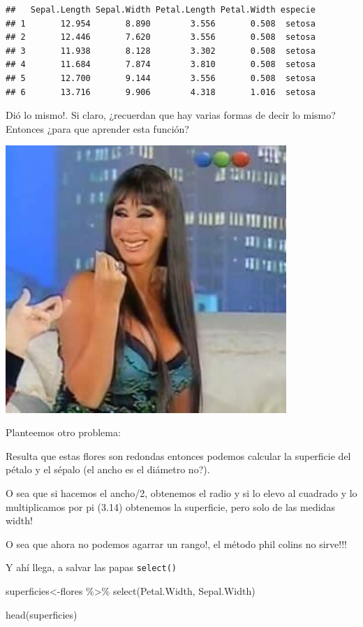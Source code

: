 \documentclass[
]{book}
\newenvironment{Shaded}{\begin{snugshade}}{\end{snugshade}}
\newcommand{\FunctionTok}[1]{\textcolor[rgb]{0.00,0.00,0.00}{#1}}
\newcommand{\NormalTok}[1]{#1}
\newcommand{\OtherTok}[1]{\textcolor[rgb]{0.56,0.35,0.01}{#1}}
\newcommand{\SpecialCharTok}[1]{\textcolor[rgb]{0.00,0.00,0.00}{#1}}
\begin{document}
\begin{verbatim}
##   Sepal.Length Sepal.Width Petal.Length Petal.Width especie
## 1       12.954       8.890        3.556       0.508  setosa
## 2       12.446       7.620        3.556       0.508  setosa
## 3       11.938       8.128        3.302       0.508  setosa
## 4       11.684       7.874        3.810       0.508  setosa
## 5       12.700       9.144        3.556       0.508  setosa
## 6       13.716       9.906        4.318       1.016  setosa
\end{verbatim}

Dió lo mismo!. Si claro, ¿recuerdan que hay varias formas de decir lo mismo?
Entonces ¿para que aprender esta función?

\includegraphics[width=4.19in]{img/moria}

Planteemos otro problema:

Resulta que estas flores son redondas entonces podemos calcular la superficie del pétalo y el sépalo (el ancho es el diámetro no?).

O sea que si hacemos el ancho/2, obtenemos el radio y si lo elevo al cuadrado y lo multiplicamos por pi (3.14) obtenemos la superficie, pero solo de las medidas width!

O sea que ahora no podemos agarrar un rango!, el método phil colins no sirve!!!

Y ahí llega, a salvar las papas \texttt{select()}

\begin{Shaded}
\begin{Highlighting}[]
\NormalTok{superficies}\OtherTok{\textless{}{-}}\NormalTok{flores }\SpecialCharTok{\%\textgreater{}\%} \FunctionTok{select}\NormalTok{(Petal.Width, Sepal.Width)}

\FunctionTok{head}\NormalTok{(superficies)}
\end{Highlighting}
\end{Shaded}
\end{document}
